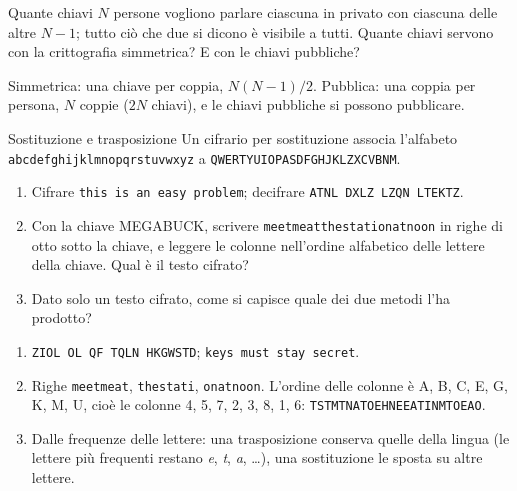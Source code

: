 \begin{esercizio}{Quante chiavi}
$N$ persone vogliono parlare ciascuna in privato con ciascuna delle altre $N - 1$; tutto ciò che due si dicono è visibile a tutti. Quante
chiavi servono con la crittografia simmetrica? E con le chiavi pubbliche?

\svolgimento
Simmetrica: una chiave per coppia, $N(N-1)/2$. Pubblica: una coppia per persona, $N$ coppie ($2N$ chiavi), e le chiavi pubbliche si possono
pubblicare.
\end{esercizio}

\begin{esercizio}{Sostituzione e trasposizione}
Un cifrario per sostituzione associa l'alfabeto \texttt{abcdefghijklmnopqrstuvwxyz} a \texttt{QWERTYUIOPASDFGHJKLZXCVBNM}.
\begin{enumerate}[label=(\alph*)]
    \item Cifrare \texttt{this is an easy problem}; decifrare \texttt{ATNL DXLZ LZQN LTEKTZ}.
    \item Con la chiave MEGABUCK, scrivere \texttt{meetmeatthestationatnoon} in righe di otto sotto la chiave, e leggere le colonne
          nell'ordine alfabetico delle lettere della chiave. Qual è il testo cifrato?
    \item Dato solo un testo cifrato, come si capisce quale dei due metodi l'ha prodotto?
\end{enumerate}

\svolgimento
\begin{enumerate}[label=(\alph*)]
    \item \texttt{ZIOL OL QF TQLN HKGWSTD}; \texttt{keys must stay secret}.
    \item Righe \texttt{meetmeat}, \texttt{thestati}, \texttt{onatnoon}. L'ordine delle colonne è A, B, C, E, G, K, M, U, cioè le colonne 4,
          5, 7, 2, 3, 8, 1, 6: \texttt{TSTMTNATOEHNEEATINMTOEAO}.
    \item Dalle frequenze delle lettere: una trasposizione conserva quelle della lingua (le lettere più frequenti restano \emph{e}, \emph{t},
          \emph{a}, \dots), una sostituzione le sposta su altre lettere.
\end{enumerate}
\end{esercizio}

